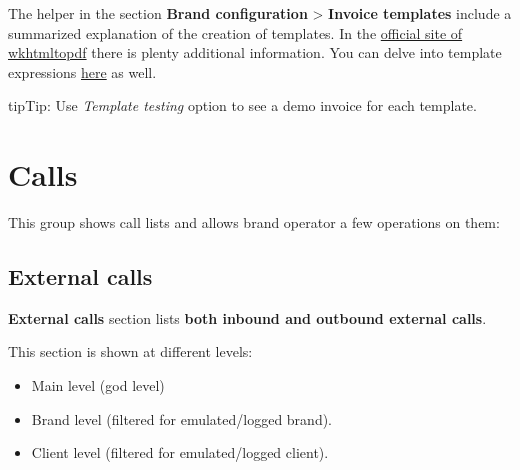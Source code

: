 \documentclass[letterpaper,10pt,english]{sphinxmanual}
\begin{document}
The helper in the section \textbf{Brand configuration} \textgreater{} \textbf{Invoice templates} include
a summarized explanation of the creation of templates. In the \href{https://wkhtmltopdf.org/usage/wkhtmltopdf.txt}{official site of wkhtmltopdf} there is plenty additional information.
You can delve into template expressions \href{http://handlebarsjs.com/expressions.html}{here} as well.

\begin{notice}{tip}{Tip:}
Use \emph{Template testing} option to see a demo invoice for each template.
\end{notice}


\section{Calls}
\label{administration_portal/brand/calls/index::doc}\label{administration_portal/brand/calls/index:calls}
This group shows call lists and allows brand operator a few operations on them:


\subsection{External calls}
\label{administration_portal/brand/calls/external_calls:id1}\label{administration_portal/brand/calls/external_calls::doc}\label{administration_portal/brand/calls/external_calls:external-calls}
\textbf{External calls} section lists \textbf{both inbound and outbound external calls}.

This section is shown at different levels:
\begin{itemize}
\item {} 
Main level (god level)

\item {} 
Brand level (filtered for emulated/logged brand).

\item {} 
Client level (filtered for emulated/logged client).

\end{itemize}
\end{document}
